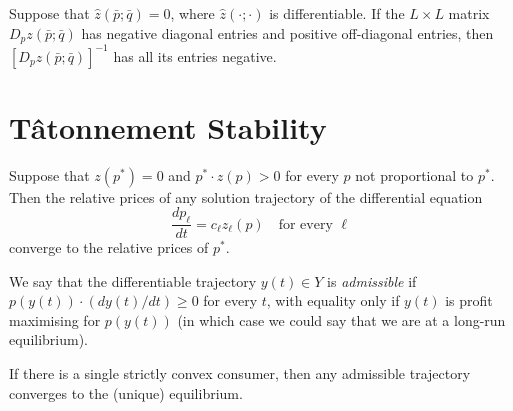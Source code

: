 \begin{prop}
    Suppose that $\hat{z} (\bar{p}; \bar{q}) = 0$, where $\hat{z}(\cdot; \cdot)$ is differentiable. If the $L \times L$ matrix $D_p z(\bar{p}; \bar{q})$ has negative diagonal entries and positive off-diagonal entries, then $[D_p z(\bar{p}; \bar{q})]^{-1}$ has all its entries negative.
\end{prop}


\section{Tâtonnement Stability}

\begin{prop}
    Suppose that $z(p^*) = 0$ and $p^* \cdot z(p) > 0$ for every $p$ not proportional to $p^*$. Then the relative prices of any solution trajectory of the differential equation 
    \begin{equation*}
        \frac{d p_\ell}{dt} = c_\ell z_\ell(p) \quad \text{for every } \ell
    \end{equation*}
    converge to the relative prices of $p^*$.
\end{prop}

\begin{defn}
    We say that the differentiable trajectory $y(t) \in Y$ is \emph{admissible} if $p(y(t)) \cdot (dy(t)/dt) \geq 0$ for every $t$, with equality only if $y(t)$ is profit maximising for $p(y(t))$ (in which case we could say that we are at a long-run equilibrium).
\end{defn}

\begin{prop}
    If there is a single strictly convex consumer, then any admissible trajectory converges to the (unique) equilibrium.
\end{prop}

